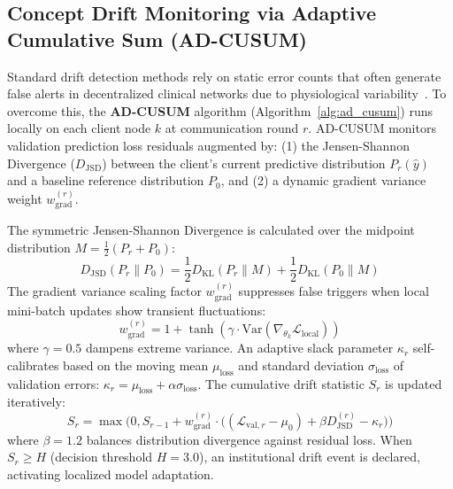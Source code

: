 \documentclass[11pt,a4paper]{article}
\begin{document}
\subsection{Concept Drift Monitoring via Adaptive Cumulative Sum (AD-CUSUM)}
Standard drift detection methods rely on static error counts that often generate false alerts in decentralized clinical networks due to physiological variability~\cite{jothimurugesan2022,bernardi2023adaptive}. To overcome this, the \textbf{AD-CUSUM} algorithm (Algorithm~\ref{alg:ad_cusum}) runs locally on each client node $k$ at communication round $r$. AD-CUSUM monitors validation prediction loss residuals augmented by: (1) the Jensen-Shannon Divergence ($D_{\text{JSD}}$) between the client's current predictive distribution $P_r(\hat{y})$ and a baseline reference distribution $P_0$, and (2) a dynamic gradient variance weight $w_{\text{grad}}^{(r)}$.

The symmetric Jensen-Shannon Divergence is calculated over the midpoint distribution $M = \frac{1}{2}(P_r + P_0)$:
\begin{equation}
D_{\text{JSD}}(P_r \parallel P_0) = \frac{1}{2} D_{\text{KL}}(P_r \parallel M) + \frac{1}{2} D_{\text{KL}}(P_0 \parallel M)
\end{equation}
The gradient variance scaling factor $w_{\text{grad}}^{(r)}$ suppresses false triggers when local mini-batch updates show transient fluctuations:
\begin{equation}
w_{\text{grad}}^{(r)} = 1 + \tanh\left(\gamma \cdot \text{Var}\left(\nabla_{\theta_k} \mathcal{L}_{\text{local}}\right)\right)
\end{equation}
where $\gamma = 0.5$ dampens extreme variance. An adaptive slack parameter $\kappa_r$ self-calibrates based on the moving mean $\mu_{\text{loss}}$ and standard deviation $\sigma_{\text{loss}}$ of validation errors: $\kappa_r = \mu_{\text{loss}} + \alpha \sigma_{\text{loss}}$. The cumulative drift statistic $S_r$ is updated iteratively:
\begin{equation}
S_r = \max\Big(0, S_{r-1} + w_{\text{grad}}^{(r)} \cdot \big((\mathcal{L}_{\text{val}, r} - \mu_0) + \beta D_{\text{JSD}}^{(r)} - \kappa_r\big)\Big)
\end{equation}
where $\beta = 1.2$ balances distribution divergence against residual loss. When $S_r \ge H$ (decision threshold $H = 3.0$), an institutional drift event is declared, activating localized model adaptation.
\end{document}
